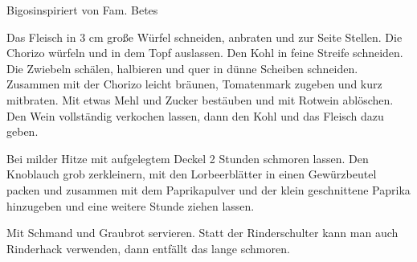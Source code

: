 \begin{recipe}{Bigos}{inspiriert von Fam. Betes}\label{Bigos}
  \inglist

\steps

Das Fleisch in 3 cm große Würfel schneiden, anbraten und zur Seite Stellen. Die
Chorizo würfeln und in dem Topf auslassen. Den Kohl in feine Streife schneiden.
Die Zwiebeln schälen, halbieren und quer in dünne Scheiben schneiden. Zusammen
mit der Chorizo leicht bräunen, Tomatenmark zugeben und kurz mitbraten. Mit
etwas Mehl und Zucker bestäuben und mit Rotwein ablöschen. Den Wein vollständig
verkochen lassen, dann den Kohl und das Fleisch dazu geben.

Bei milder Hitze mit aufgelegtem Deckel 2 Stunden schmoren lassen. Den Knoblauch
grob zerkleinern, mit den Lorbeerblätter in einen Gewürzbeutel packen und
zusammen mit dem Paprikapulver und der klein geschnittene Paprika hinzugeben und
eine weitere \halb Stunde ziehen lassen.

Mit Schmand und Graubrot servieren. Statt der Rinderschulter kann man auch
Rinderhack verwenden, dann entfällt das lange schmoren.

\end{recipe}
